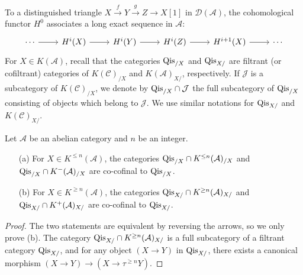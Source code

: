 To a distinguished triangle $X\stackrel{f}{\to} Y\stackrel{g}{\to} Z\to X[1]$ in $\mathcal{D}(\mathcal{A})$, the cohomological functor $H^0$ associates a long exact sequence in $\mathcal{A}$:
\[\begin{tikzcd}
\cdots\ar[r]&H^i(X)\ar[r]&H^i(Y)\ar[r]&H^i(Z)\ar[r]&H^{i+1}(X)\ar[r]&\cdots
\end{tikzcd}\]
For $X\in K(\mathcal{A})$, recall that the categories $\mathrm{Qis}_{/X}$ and $\mathrm{Qis}_{X/}$ are filtrant (or cofiltrant) categories of $K(\mathcal{C})_{/X}$ and $K(\mathcal{A})_{X/}$, respectively. If $\mathcal{J}$ is a subcategory of $K(\mathcal{C})_{/X}$, we denote by $\mathrm{Qis}_{/X}\cap\mathcal{J}$ the full subcategory of $\mathrm{Qis}_{/X}$ consisting of objects which belong to $\mathcal{J}$. We use similar notations for $\mathrm{Qis}_{X/}$ and $K(\mathcal{C})_{X/}$.

\begin{lemma}\label{derived category Qis cofinal truncation}
Let $\mathcal{A}$ be an abelian category and $n$ be an integer.
\begin{enumerate}
    \item[(a)] For $X\in K^{\leq n}(\mathcal{A})$, the categories $\mathrm{Qis}_{/X}\cap K^{\leq n}(\mathcal{A})_{/X}$ and $\mathrm{Qis}_{/X}\cap K^{-}(\mathcal{A})_{/X}$ are co-cofinal to $\mathrm{Qis}_{/X}$.
    \item[(b)] For $X\in K^{\geq n}(\mathcal{A})$, the categories $\mathrm{Qis}_{X/}\cap K^{\geq n}(\mathcal{A})_{X/}$ and $\mathrm{Qis}_{X/}\cap K^{+}(\mathcal{A})_{X/}$ are co-cofinal to $\mathrm{Qis}_{X/}$.
\end{enumerate}
\end{lemma}
\begin{proof}
The two statements are equivalent by reversing the arrows, so we only prove (b). The category $\mathrm{Qis}_{X/}\cap K^{\geq n}(\mathcal{A})_{X/}$ is a full subcategory of a filtrant category $\mathrm{Qis}_{X/}$, and for any object $(X\to Y)$ in $\mathrm{Qis}_{X/}$, there exists a canonical morphism $(X\to Y)\to(X\to\tau^{\geq n}Y)$.
\end{proof}

